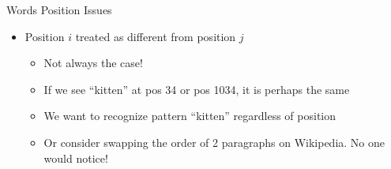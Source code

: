 \documentclass[aspectratio=169]{beamer}
\begin{document}
\begin{frame}{Words Position Issues}

\begin{itemize}
	\item Position $i$ treated as different from position $j$
	\begin{itemize}
	\item Not always the case!
	\item If we see ``kitten'' at pos 34 or pos 1034, it is perhaps the same
	\item We want to recognize pattern ``kitten'' regardless of position
	\item Or consider swapping the order of 2 paragraphs on Wikipedia. No one would notice!
	\end{itemize}
\end{itemize}
\end{frame}
\end{document}

